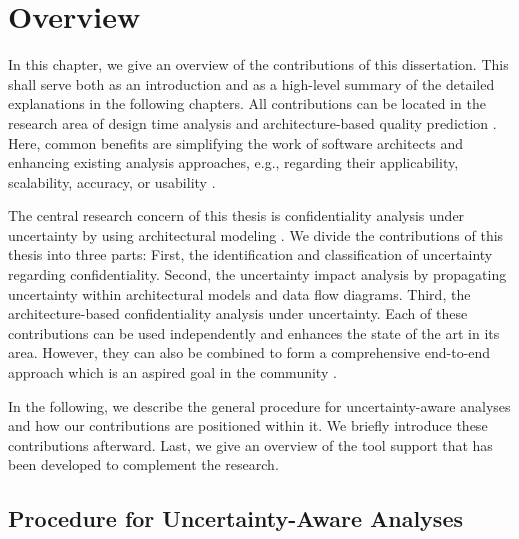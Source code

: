 \chapter{Overview}%
\label{ch:overview}%


In this chapter, we give an overview of the contributions of this dissertation.
This shall serve both as an introduction and as a high-level summary of the detailed explanations in the following chapters.
All contributions can be located in the research area of design time analysis and architecture-based quality prediction \cite{reussner_modeling_2016}.
Here, common benefits are simplifying the work of software architects and enhancing existing analysis approaches, e.g., regarding their applicability, scalability, accuracy, or usability \cite{konersmann_evaluation_2022}.

The central research concern of this thesis is confidentiality analysis under uncertainty by using architectural modeling \cite{hahner_dealing_2021}.
We divide the contributions of this thesis into three parts:
First, the identification and classification of uncertainty regarding confidentiality.
Second, the uncertainty impact analysis by propagating uncertainty within architectural models and data flow diagrams.
Third, the architecture-based confidentiality analysis under uncertainty.
Each of these contributions can be used independently and enhances the state of the art in its area.
However, they can also be combined to form a comprehensive end-to-end approach which is an aspired goal in the community \cite{weyns_towards_2023,hezavehi_uncertainty_2021}.

In the following, we describe the general procedure for uncertainty-aware analyses and how our contributions are positioned within it.
We briefly introduce these contributions afterward.
Last, we give an overview of the tool support that has been developed to complement the research.






\section{Procedure for Uncertainty-Aware Analyses}%
\label{sec:overview:procedure}

